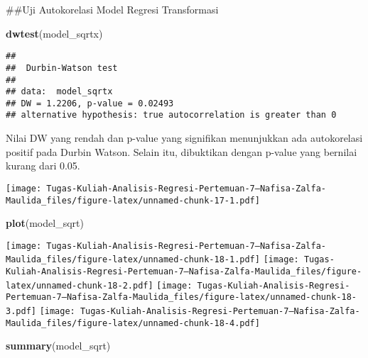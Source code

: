 \documentclass[
]{article}
\newenvironment{Shaded}{\begin{snugshade}}{\end{snugshade}}
\newcommand{\AttributeTok}[1]{\textcolor[rgb]{0.13,0.29,0.53}{#1}}
\newcommand{\FunctionTok}[1]{\textcolor[rgb]{0.13,0.29,0.53}{\textbf{#1}}}
\newcommand{\NormalTok}[1]{#1}
\newcommand{\OtherTok}[1]{\textcolor[rgb]{0.56,0.35,0.01}{#1}}
\newcommand{\SpecialCharTok}[1]{\textcolor[rgb]{0.81,0.36,0.00}{\textbf{#1}}}
\begin{document}
\#\#Uji Autokorelasi Model Regresi Transformasi

\begin{Shaded}
\begin{Highlighting}[]
\FunctionTok{dwtest}\NormalTok{(model\_sqrtx)}
\end{Highlighting}
\end{Shaded}

\begin{verbatim}
## 
##  Durbin-Watson test
## 
## data:  model_sqrtx
## DW = 1.2206, p-value = 0.02493
## alternative hypothesis: true autocorrelation is greater than 0
\end{verbatim}

Nilai DW yang rendah dan p-value yang signifikan menunjukkan ada
autokorelasi positif pada Durbin Watson. Selain itu, dibuktikan dengan
p-value yang bernilai kurang dari 0.05.

\begin{Shaded}
\end{Shaded}

\texttt{[image: Tugas-Kuliah-Analisis-Regresi-Pertemuan-7---Nafisa-Zalfa-Maulida\_files/figure-latex/unnamed-chunk-17-1.pdf]}

\begin{Shaded}
\begin{Highlighting}[]
\FunctionTok{plot}\NormalTok{(model\_sqrt)}
\end{Highlighting}
\end{Shaded}

\texttt{[image: Tugas-Kuliah-Analisis-Regresi-Pertemuan-7---Nafisa-Zalfa-Maulida\_files/figure-latex/unnamed-chunk-18-1.pdf]}
\texttt{[image: Tugas-Kuliah-Analisis-Regresi-Pertemuan-7---Nafisa-Zalfa-Maulida\_files/figure-latex/unnamed-chunk-18-2.pdf]}
\texttt{[image: Tugas-Kuliah-Analisis-Regresi-Pertemuan-7---Nafisa-Zalfa-Maulida\_files/figure-latex/unnamed-chunk-18-3.pdf]}
\texttt{[image: Tugas-Kuliah-Analisis-Regresi-Pertemuan-7---Nafisa-Zalfa-Maulida\_files/figure-latex/unnamed-chunk-18-4.pdf]}

\begin{Shaded}
\begin{Highlighting}[]
\FunctionTok{summary}\NormalTok{(model\_sqrt)}
\end{Highlighting}
\end{Shaded}
\end{document}
